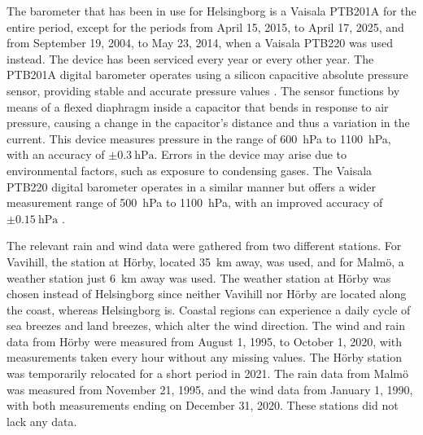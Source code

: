 The barometer that has been in use for Helsingborg is a Vaisala PTB201A for the entire period, except for the periods from April 15, 2015, to April 17, 2025, and from September 19, 2004, to May 23, 2014, when a Vaisala PTB220 was used instead. The device has been serviced every year or every other year. The PTB201A digital barometer operates using a silicon capacitive absolute pressure sensor, providing stable and accurate pressure values \cite{vaisalaPTB200DIGITAL1993}. The sensor functions by means of a flexed diaphragm inside a capacitor that bends in response to air pressure, causing a change in the capacitor’s distance and thus a variation in the current. This device measures pressure in the range of \SI{600}{\hecto\pascal} to \SI{1100}{\hecto\pascal}, with an accuracy of $\pm\SI{0.3}{\hecto\pascal}$. Errors in the device may arise due to environmental factors, such as exposure to condensing gases. The Vaisala PTB220 digital barometer operates in a similar manner but offers a wider measurement range of \SI{500}{\hecto\pascal} to \SI{1100}{\hecto\pascal}, with an improved accuracy of $\pm\SI{0.15}{\hecto\pascal}$ \cite{vaisalaPTB220SeriesDigital2001}.

The relevant rain and wind data were gathered from two different stations. For Vavihill, the station at Hörby, located \SI{35}{\km} away, was used, and for Malmö, a weather station just \SI{6}{\km} away was used. The weather station at Hörby was chosen instead of Helsingborg since neither Vavihill nor Hörby are located along the coast, whereas Helsingborg is. Coastal regions can experience a daily cycle of sea breezes and land breezes, which alter the wind direction. The wind and rain data from Hörby were measured from August 1, 1995, to October 1, 2020, with measurements taken every hour without any missing values. The Hörby station was temporarily relocated for a short period in 2021. The rain data from Malmö was measured from November 21, 1995, and the wind data from January 1, 1990, with both measurements ending on December 31, 2020. These stations did not lack any data.

